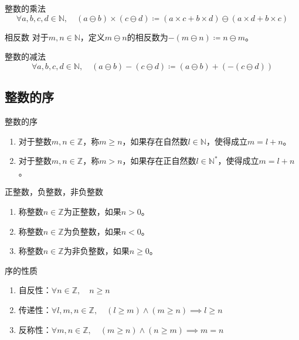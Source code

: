 \documentclass[lang = cn, scheme = chinese, thmcnt = section]{elegantbook}
\newcommand{\N}{\mathbb{N}}            %
\newcommand{\Z}{\mathbb{Z}}            %
\begin{document}
\begin{definition}{整数的乘法}
	$$
	\forall a,b,c,d\in\N,\quad (a \ominus b) \times (c \ominus d)\coloneqq (a\times c+b\times d)\ominus(a\times d+b\times c)
	$$
\end{definition}

\begin{definition}{相反数}
	对于$m,n\in\N$，定义$m\ominus n$的相反数为$-(m \ominus n)\coloneqq n \ominus m$。
\end{definition}

\begin{definition}{整数的减法}
	$$
	\forall a,b,c,d\in\N,\quad (a \ominus b)-(c \ominus d)\coloneqq (a \ominus b)+(-(c \ominus d))
	$$
\end{definition}

\subsection{整数的序}

\begin{definition}{整数的序}
	\begin{enumerate}
		\item 对于整数$m,n\in\Z$，称$m \ge n$，如果存在自然数$l\in\N$，使得成立$m=l+n$。
		\item 对于整数$m,n\in\Z$，称$m > n$，如果存在正自然数$l\in\N^*$，使得成立$m=l+n$。
	\end{enumerate}
\end{definition}

\begin{definition}{正整数，负整数，非负整数}
	\begin{enumerate}
		\item 称整数$n\in\Z$为正整数，如果$n>0$。
		\item 称整数$n\in\Z$为负整数，如果$n<0$。
		\item 称整数$n\in\Z$为非负整数，如果$n\ge 0$。
	\end{enumerate}
\end{definition}

\begin{proposition}{序的性质}
	\begin{enumerate}
		\item 自反性：$\forall n\in\Z,\quad n \ge n$
		\item 传递性：$\forall l,m,n\in\Z,\quad (l\ge m)\wedge(m\ge n)\implies l\ge n$
		\item 反称性：$\forall m,n\in\Z,\quad (m\ge n)\wedge(n\ge m)\implies m=n$
	\end{enumerate}
\end{proposition}
\end{document}
